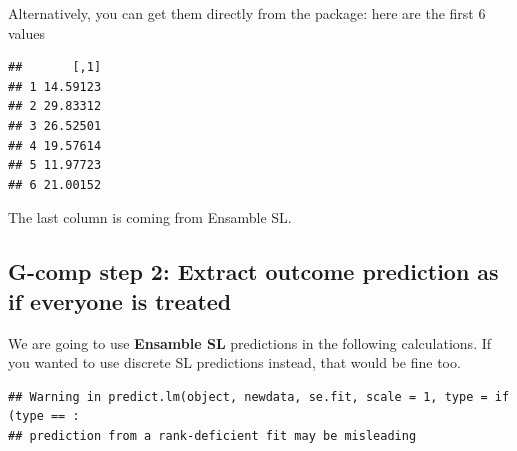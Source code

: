 \documentclass[
]{book}
\newenvironment{Shaded}{\begin{snugshade}}{\end{snugshade}}
\newcommand{\AttributeTok}[1]{\textcolor[rgb]{0.77,0.63,0.00}{#1}}
\newcommand{\DecValTok}[1]{\textcolor[rgb]{0.00,0.00,0.81}{#1}}
\newcommand{\FunctionTok}[1]{\textcolor[rgb]{0.00,0.00,0.00}{#1}}
\newcommand{\NormalTok}[1]{#1}
\newcommand{\OtherTok}[1]{\textcolor[rgb]{0.56,0.35,0.01}{#1}}
\newcommand{\SpecialCharTok}[1]{\textcolor[rgb]{0.00,0.00,0.00}{#1}}
\newcommand{\StringTok}[1]{\textcolor[rgb]{0.31,0.60,0.02}{#1}}
\begin{document}
Alternatively, you can get them directly from the package: here are the first 6 values

\begin{Shaded}
\end{Shaded}

\begin{verbatim}
##       [,1]
## 1 14.59123
## 2 29.83312
## 3 26.52501
## 4 19.57614
## 5 11.97723
## 6 21.00152
\end{verbatim}

The last column is coming from Ensamble SL.

\hypertarget{g-comp-step-2-extract-outcome-prediction-as-if-everyone-is-treated-2}{%
\subsection{G-comp step 2: Extract outcome prediction as if everyone is treated}\label{g-comp-step-2-extract-outcome-prediction-as-if-everyone-is-treated-2}}

We are going to use \textbf{Ensamble SL} predictions in the following calculations. If you wanted to use discrete SL predictions instead, that would be fine too.

\begin{Shaded}
\end{Shaded}

\begin{verbatim}
## Warning in predict.lm(object, newdata, se.fit, scale = 1, type = if (type == :
## prediction from a rank-deficient fit may be misleading
\end{verbatim}

\begin{Shaded}
\end{Shaded}
\end{document}
